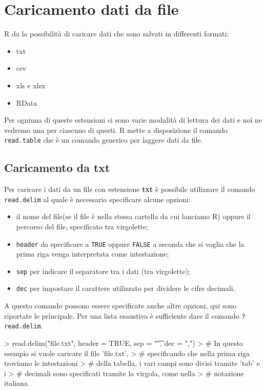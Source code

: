 \section{Caricamento dati da file}
R da la possibilità di caricare dati che sono salvati in differenti formati:
\begin{itemize}
  \item txt
  \item csv
  \item xls e xlsx
  \item RData
\end{itemize}
Per ogniuna di queste estensioni ci sono varie modalità di lettura dei dati e 
noi ne vedremo una per ciascuno di questi. R mette a disposizione il comando 
\texttt{read.table} che è un comando generico per laggere dati da file.

\subsection{Caricamento da txt}
Per caricare i dati da un file con estensione \textbf{txt} è possibile utilizzare
il comando \texttt{read.delim} al quale è necessario specificare alcune opzioni:
\begin{itemize}
  \item il nome del file(se il file è nella stessa cartella da cui lanciamo R)
  oppure il percorso del file, specificato tra virgolette;
  \item \texttt{header} da specificare a \texttt{TRUE} oppure \texttt{FALSE} a 
  seconda che si voglia che la prima riga venga interpretata come intestazione;
  \item \texttt{sep} per indicare il separatore tra i dati (tra virgolette);
  \item \texttt{dec} per impostare il carattere utilizzato per dividere le 
  cifre decimali.
\end{itemize}
A questo comando possono essere specificate anche altre opzioni, qui sono 
riportate le principale. Per una lista esaustiva è sufficiente dare il comando
\texttt{?read.delim}.

\begin{Schunk}
\begin{Sinput}
> read.delim("file.txt", header = TRUE, sep = "\t", dec = ",")
> # In questo esempio si vuole caricare il file 'file.txt', 
> # specificando che nella prima riga troviamo le intestazioni 
> # della tabella, i vari campi sono divisi tramite 'tab' e i 
> # decimali sono specificati tramite la virgola, come nella 
> # notazione italiana
\end{Sinput}
\end{Schunk}

